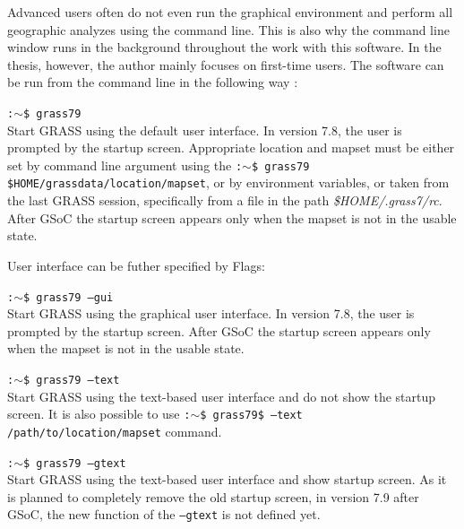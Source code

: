 \documentclass[a4paper,10pt,twoside]{article}
\begin{document}
\noindent Advanced users often do not even run the graphical
environment and perform all geographic analyzes using the command
line. This is also why the command line window runs in the background
throughout the work with this software. In the thesis, however, the author
mainly focuses on first-time users.
The software can be run from 
the command line in the following way \cite{startup}:

\noindent \texttt{:$\sim$\$ grass79} \\
\noindent Start GRASS using the default user interface. In version
7.8, the user is prompted by the startup screen. 
Appropriate location and mapset must be either set by command line argument
using the \texttt{:$\sim$\$ grass79
  \$HOME/grassdata/location/mapset}, or by environment variables, 
  or taken from the last
GRASS session, specifically from a file in the path
\textit{\$HOME/.grass7/rc}. 
After GSoC the startup
screen appears only when the mapset is not in the usable state.

\noindent User interface can be futher specified by Flags:

\noindent \texttt{:$\sim$\$ grass79 --gui}\\
\noindent Start GRASS using the graphical user interface.  In version
7.8, the user is prompted by the startup screen. After GSoC the startup
screen appears only when the mapset is not in the usable state.

\noindent \texttt{:$\sim$\$ grass79 --text} \\
\noindent Start GRASS using the text-based user interface and do not show the startup
screen.
It is also possible to use
\texttt{:$\sim$\$ grass79\$ --text /path/to/location/mapset} command.

\newpage
\noindent \texttt{:$\sim$\$ grass79 --gtext} \\
\noindent Start GRASS using the text-based user interface and show startup screen.  
As it is planned to completely remove the old startup screen, in version 7.9 after GSoC, 
the new function of the \texttt{--gtext} is not defined yet. 
\end{document}
